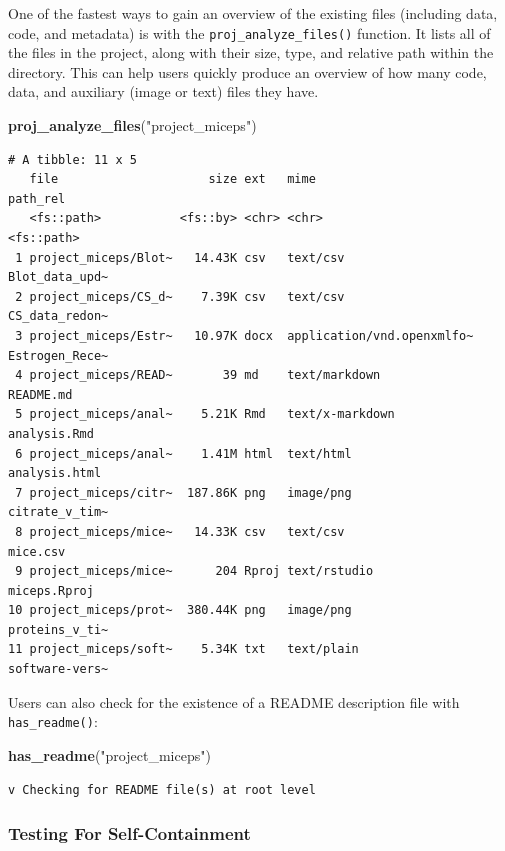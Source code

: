 \documentclass[12pt,twoside]{reedthesis}
\newenvironment{Shaded}{\begin{snugshade}}{\end{snugshade}}
\newcommand{\KeywordTok}[1]{\textcolor[rgb]{0.13,0.29,0.53}{\textbf{#1}}}
\newcommand{\NormalTok}[1]{#1}
\newcommand{\StringTok}[1]{\textcolor[rgb]{0.31,0.60,0.02}{#1}}
\begin{document}
One of the fastest ways to gain an overview of the existing files (including data, code, and metadata) is with the \texttt{proj\_analyze\_files()} function. It lists all of the files in the project, along with their size, type, and relative path within the directory. This can help users quickly produce an overview of how many code, data, and auxiliary (image or text) files they have.
\begin{Shaded}
\begin{Highlighting}[]
\KeywordTok{proj_analyze_files}\NormalTok{(}\StringTok{"project_miceps"}\NormalTok{)}
\end{Highlighting}
\end{Shaded}
\footnotesize
\begin{verbatim}
# A tibble: 11 x 5
   file                     size ext   mime                       path_rel      
   <fs::path>           <fs::by> <chr> <chr>                      <fs::path>    
 1 project_miceps/Blot~   14.43K csv   text/csv                   Blot_data_upd~
 2 project_miceps/CS_d~    7.39K csv   text/csv                   CS_data_redon~
 3 project_miceps/Estr~   10.97K docx  application/vnd.openxmlfo~ Estrogen_Rece~
 4 project_miceps/READ~       39 md    text/markdown              README.md     
 5 project_miceps/anal~    5.21K Rmd   text/x-markdown            analysis.Rmd  
 6 project_miceps/anal~    1.41M html  text/html                  analysis.html 
 7 project_miceps/citr~  187.86K png   image/png                  citrate_v_tim~
 8 project_miceps/mice~   14.33K csv   text/csv                   mice.csv      
 9 project_miceps/mice~      204 Rproj text/rstudio               miceps.Rproj  
10 project_miceps/prot~  380.44K png   image/png                  proteins_v_ti~
11 project_miceps/soft~    5.34K txt   text/plain                 software-vers~
\end{verbatim}
\normalsize

Users can also check for the existence of a README description file with \texttt{has\_readme()}:
\begin{Shaded}
\begin{Highlighting}[]
\KeywordTok{has_readme}\NormalTok{(}\StringTok{"project_miceps"}\NormalTok{)}
\end{Highlighting}
\end{Shaded}
\begin{verbatim}
v Checking for README file(s) at root level
\end{verbatim}
\hypertarget{testing-for-self-containment}{%
\subsubsection{Testing For Self-Containment}\label{testing-for-self-containment}}
\end{document}
